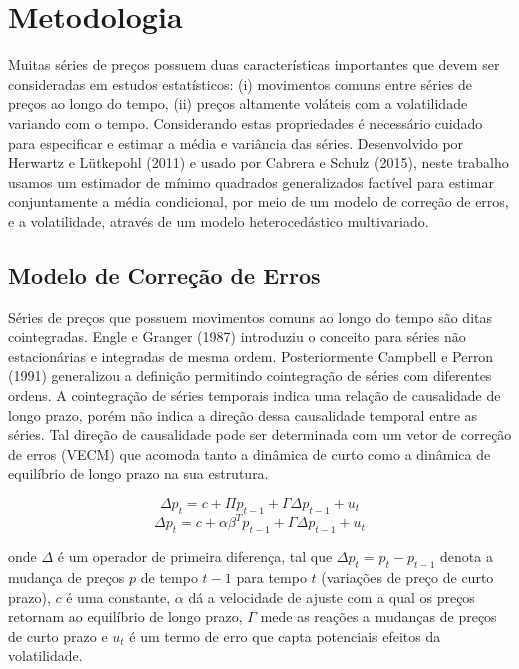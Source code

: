 \documentclass[a4paper,12pt] {article}
\begin{document}
\section{Metodologia}

 Muitas séries de preços  possuem duas características importantes que devem ser consideradas em estudos estatísticos: (i) movimentos comuns entre séries de preços ao longo do tempo, (ii) preços altamente voláteis com a volatilidade variando com o tempo. Considerando estas propriedades  é necessário cuidado para especificar e estimar a média e variância das séries.  Desenvolvido por Herwartz e Lütkepohl (2011) e  usado por Cabrera e Schulz (2015), neste trabalho usamos um estimador de mínimo quadrados generalizados factível para  estimar conjuntamente a média condicional, por meio de um modelo de correção de erros, e a  volatilidade, através de um modelo heterocedástico multivariado.
 
 
 \subsection{Modelo de Correção de Erros} 
 
 
 Séries de preços que possuem movimentos comuns ao longo do tempo são ditas cointegradas. Engle e Granger (1987) introduziu o conceito para séries não estacionárias e integradas de mesma ordem. Posteriormente  Campbell e Perron (1991) generalizou a definição permitindo cointegração de séries com diferentes ordens. A  cointegração de séries temporais indica uma relação de causalidade de longo prazo, porém não indica a direção dessa causalidade temporal entre as séries. Tal direção de causalidade pode ser determinada com um vetor de correção de erros (VECM) que acomoda  tanto a dinâmica de curto como a dinâmica de equilíbrio de longo prazo na sua estrutura.
 
  \begin{equation}
  \Delta p_{t} =c+\Pi p_{t-1} + \Gamma \Delta p_{t-1}+u_t
  \end{equation}
  \begin{equation}
 \Delta p_{t} = c+\alpha \beta ^T  p_{t-1} + \Gamma \Delta p_{t-1}+u_t
\end{equation}
 
  onde $\Delta$ é um operador de primeira diferença, tal que $\Delta p_{t} = p_t-p_{t - 1}$ denota a mudança de preços $p$ de tempo $t-1$ para tempo $t$ (variações de preço de curto prazo), $c$ é uma constante, $\alpha$ dá a velocidade de ajuste com a qual os preços retornam ao equilíbrio de longo prazo, $\Gamma$ mede as reações a mudanças de preços de curto prazo e $u_t$ é um termo de erro que capta potenciais efeitos da volatilidade.
  
\end{document}
